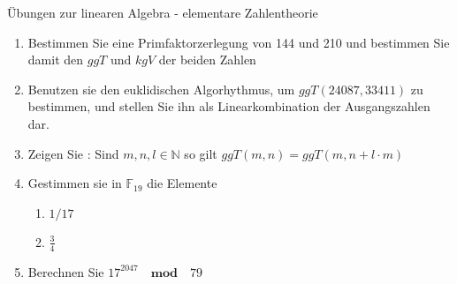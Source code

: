 \documentclass[a4paper]{article}
\begin{document}
Übungen zur linearen Algebra - elementare Zahlentheorie
\begin{enumerate}
\item Bestimmen Sie eine Primfaktorzerlegung von 144 und 210 und bestimmen Sie damit den $ggT$ und $kgV$ der beiden Zahlen 
\item Benutzen sie den euklidischen Algorhythmus, um $ggT( 24087,  33411 ) $ zu bestimmen, und stellen Sie ihn als Linearkombination der Ausgangszahlen dar.
\item Zeigen Sie : Sind $m, n, l \in \mathbb N$ so gilt $ggT( m, n ) = ggT( m, n + l \cdot m)$
\item Gestimmen sie in $ \mathbb{F}_{19}$ die Elemente
\begin{enumerate} 
\item $1/17$
\item $\frac{3}{4}$
\end{enumerate}
\item Berechnen Sie $17^{2047} \quad\textbf{mod} \quad 79$
\end{enumerate}
\end{document}
